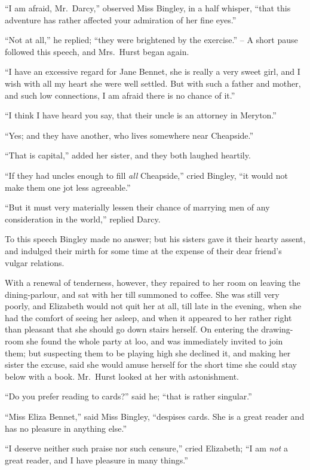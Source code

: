 “I am afraid, Mr.\ Darcy,” observed Miss Bingley, in
a half whisper, “that this adventure has rather affected
your admiration of her fine eyes.”

“Not at all,” he replied; “they were brightened by
the exercise.” -- A short pause followed this speech, and
Mrs.\ Hurst began again.

“I have an excessive regard for Jane Bennet, she is
really a very sweet girl, and I wish with all my heart she
were well settled. But with such a father and mother, and
such low connections, I am afraid there is no chance of it.”

“I think I have heard you say, that their uncle is an
attorney in Meryton.”

“Yes; and they have another, who lives somewhere
near Cheapside.”

“That is capital,” added her sister, and they both
laughed heartily.

“If they had uncles enough to fill \textit{all} Cheapside,” cried
Bingley, “it would not make them one jot less agreeable.”

“But it must very materially lessen their chance of
marrying men of any consideration in the world,” replied
Darcy.

To this speech Bingley made no answer; but his sisters
gave it their hearty assent, and indulged their mirth for
some time at the expense of their dear friend’s vulgar
relations.

With a renewal of tenderness, however, they repaired
to her room on leaving the dining-parlour, and sat with
her till summoned to coffee. She was still very poorly,
and Elizabeth would not quit her at all, till late in the
evening, when she had the comfort of seeing her asleep,
and when it appeared to her rather right than pleasant
that she should go down stairs herself. On entering the
drawing-room she found the whole party at loo, and was
immediately invited to join them; but suspecting them
to be playing high she declined it, and making her sister
the excuse, said she would amuse herself for the short
time she could stay below with a book. Mr.\ Hurst looked
at her with astonishment.

“Do you prefer reading to cards?” said he; “that
is rather singular.”

“Miss Eliza Bennet,” said Miss Bingley, “despises cards.
She is a great reader and has no pleasure in anything else.”

“I deserve neither such praise nor such censure,” cried
Elizabeth; “I am \textit{not} a great reader, and I have pleasure
in many things.”

